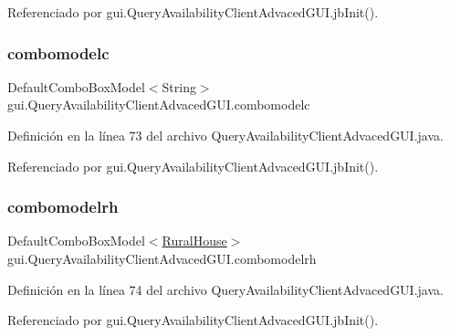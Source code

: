 Referenciado por gui.\+Query\+Availability\+Client\+Advaced\+G\+U\+I.\+jb\+Init().

\mbox{\label{classgui_1_1_query_availability_client_advaced_g_u_i_af2ed92b442f0e62618b199a892755429}} 
\subsubsection{\texorpdfstring{combomodelc}{combomodelc}}
{\footnotesize\ttfamily Default\+Combo\+Box\+Model$<$String$>$ gui.\+Query\+Availability\+Client\+Advaced\+G\+U\+I.\+combomodelc\hspace{0.3cm}{\ttfamily [private]}}



Definición en la línea 73 del archivo Query\+Availability\+Client\+Advaced\+G\+U\+I.\+java.



Referenciado por gui.\+Query\+Availability\+Client\+Advaced\+G\+U\+I.\+jb\+Init().

\mbox{\label{classgui_1_1_query_availability_client_advaced_g_u_i_af9fbcdbb24f0e8c6bd10078eb1c90527}} 
\subsubsection{\texorpdfstring{combomodelrh}{combomodelrh}}
{\footnotesize\ttfamily Default\+Combo\+Box\+Model$<$\mbox{\hyperlink{classdomain_1_1_rural_house}{Rural\+House}}$>$ gui.\+Query\+Availability\+Client\+Advaced\+G\+U\+I.\+combomodelrh\hspace{0.3cm}{\ttfamily [private]}}



Definición en la línea 74 del archivo Query\+Availability\+Client\+Advaced\+G\+U\+I.\+java.



Referenciado por gui.\+Query\+Availability\+Client\+Advaced\+G\+U\+I.\+jb\+Init().

